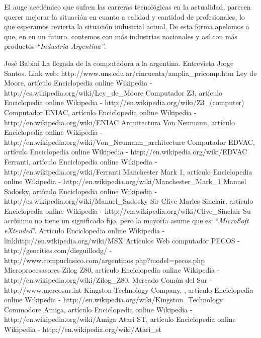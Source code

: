 \documentclass[%
 	final,
%
	notitlepage,
	narroweqnarray,
	inline,
 	twoside,
	]{ieee}
\newcommand{\link}[1]{\textit{}{#1}}
\begin{document}
El auge aced\'emico que sufren las carreras tecnol\'ogicas en la actualidad, parecen querer mejorar la situaci\'on en cuanto a calidad y cantidad de profesionales, lo que esperamos revierta la situaci\'on industrial actual. De esta forma apelamos a que, en en un futuro, contemos con m\'as industrias nacionales y as\'i con m\'as productos \textit{``Industria Argentina''}.



\begin{thebibliography}{1}

 Jos\'e Babini La llegada de la computadora a la argentina.
 Entrevista Jorge Santos.
 Link web: \link{http://www.uns.edu.ar/cincuenta/amplia\_pricomp.htm}
 Ley de Moore, art\'iculo Enciclopedia online Wikipedia -\link{http://es.wikipedia.org/wiki/Ley\_de\_Moore}
 Computador Z3, art\'iculo Enciclopedia online Wikipedia - \link{http://en.wikipedia.org/wiki/Z3\_(computer)}
 Computador ENIAC, art\'iculo Enciclopedia online Wikipedia - \link{http://en.wikipedia.org/wiki/ENIAC}
 Arquitectura Von Neumann, art\'iculo Enciclopedia online Wikipedia - \link{http://en.wikipedia.org/wiki/Von\_Neumann\_architecture}
 Computador EDVAC, art\'iculo Enciclopedia online Wikipedia - \link{http://en.wikipedia.org/wiki/EDVAC}
 Ferranti, art\'iculo Enciclopedia online Wikipedia - \link{http://en.wikipedia.org/wiki/Ferranti}
 Manchester Mark 1, art\'iculo Enciclopedia online Wikipedia - \link{http://en.wikipedia.org/wiki/Manchester\_Mark\_1}
 Manuel Sadosky, art\'iculo Enciclopedia online Wikipedia - \link{http://es.wikipedia.org/wiki/Manuel\_Sadosky}
 Sir Clive Marles Sinclair, art\'iculo Enciclopedia online Wikipedia - \link{http://en.wikipedia.org/wiki/Clive\_Sinclair}
 Su acr\'onimo no tiene un significado fijo, pero la mayor\'ia asume que es: ``\textit{MicroSoft eXtended}''. Art\'iculo Enciclopedia online Wikipedia - link{http://en.wikipedia.org/wiki/MSX}
 Art\'iculos Web computador PECOS - \link{http://geocities.com/dieguillodg/} - \link{http://www.compuclasico.com/argentinos.php?model=pecos.php}
 Microprocesasores Zilog Z80, art\'iculo Enciclopedia online Wikipedia - \link{http://en.wikipedia.org/wiki/Zilog\_Z80}.
 Mercado Com\'un del Sur - \link{http://www.mercosur.int}
 Kingston Technology Company, , art\'iculo Enciclopedia online Wikipedia - \link{http://en.wikipedia.org/wiki/Kingston\_Technology}
 Commodore Amiga, art\'iculo Enciclopedia online Wikipedia - \link{http://en.wikipedia.org/wiki/Amiga}
 Atari ST, art\'iculo Enciclopedia online Wikipedia - \link{http://en.wikipedia.org/wiki/Atari\_st}




\end{thebibliography}
\end{document}
